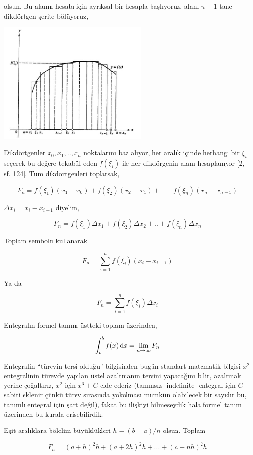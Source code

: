 \documentclass[12pt,fleqn]{article}\usepackage{../../common}
\begin{document}
olsun. Bu alanın hesabı için ayrıksal bir hesapla başlıyoruz, alanı $n-1$ tane
dikdörtgen şerite bölüyoruz,

\includegraphics[width=20em]{ode_mattuck_65_diffint1_04.jpg}

Dikdörtgenler $x_0,x_1,..,x_n$ noktalarını baz alıyor, her aralık içinde
herhangi bir $\xi_i$ seçerek bu değere tekabül eden $f(\xi_i)$ ile her
dikdörgenin alanı hesaplanıyor [2, sf. 124]. Tum dikdortgenleri toplarsak,

$$
F_n = f(\xi_1)(x_1 - x_0) + f(\xi_2)(x_2 - x_1) + .. + f(\xi_n)(x_n - x_{n-1})
$$

$\Delta x_i = x_i - x_{i-1}$ diyelim, 

$$
F_n = f(\xi_1)\Delta x_1 + f(\xi_2)\Delta x_2 + .. + f(\xi_n)\Delta x_n
$$

Toplam sembolu kullanarak

$$
F_n = \sum _{i=1}^{n} f(\xi_i) (x_i - x_{i-1}) 
$$

Ya da

$$
F_n = \sum _{i=1}^{n} f(\xi_i) \Delta x_i
$$

Entegralın formel tanımı üstteki toplam üzerinden,

$$
\int _{a}^{b} f(x) \,\mathrm{d} x = \lim_{n \to \infty} F_n
$$

Entegralin ``türevin tersi olduğu'' bilgisinden bugün standart matematik bilgisi
$x^2$ entegralinin türevde yapılan üstel azaltmanın tersini yapacağını bilir,
azaltmak yerine çoğaltırız, $x^2$ için $x^3 + C$ elde ederiz (tanımsız
-indefinite- entegral için $C$ sabiti eklenir çünkü türev sırasında yokolması
mümkün olabilecek bir sayıdır bu, tanımlı entegral için şart değil), fakat
bu ilişkiyi bilmeseydik hala formel tanım üzerinden bu kurala erisebilirdik. 

Eşit aralıklara bölelim büyüklükleri $h = (b-a)/n$ olsun. Toplam

$$
F_n = (a+h)^2 h + (a+2h)^2 h + ... + (a+nh)^2 h
$$
\end{document}
